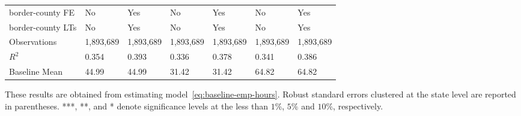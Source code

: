 \begin{table}[H]
{\begin{tabular}{@{}lllllll@{}}
            border-county FE             & No        & Yes       & No        & Yes       & No        & Yes       \\
            border-county LTs            & No        & Yes       & No        & Yes       & No        & Yes       \\ \midrule
            Observations                 & 1,893,689 & 1,893,689 & 1,893,689 & 1,893,689 & 1,893,689 & 1,893,689 \\
            $R^2$                        & 0.354     & 0.393     & 0.336     & 0.378     & 0.341     & 0.386     \\
            Baseline Mean                & 44.99     & 44.99     & 31.42     & 31.42     & 64.82     & 64.82     \\ \bottomrule \bottomrule
        \end{tabular}%
    }
    \begin{minipage}{18cm}
        \vspace{0.05in}
        These results are obtained from estimating model~\ref{eq:baseline-emp-hours}. Robust standard errors clustered at the state level are reported in parentheses. ***, **, and * denote significance levels at the less than $1\%$, $5\%$ and $10\%$, respectively.
    \end{minipage}
\end{table}